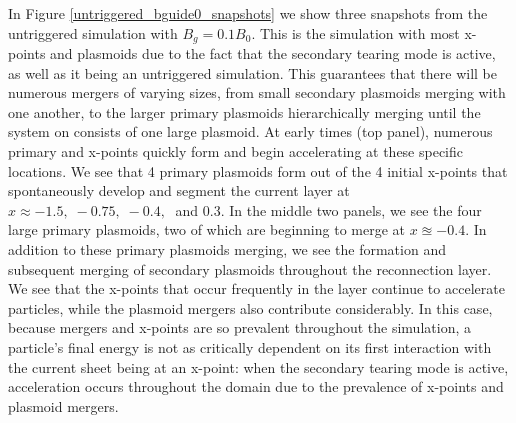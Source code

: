 \documentclass[iop,twocolappendix]{emulateapj}
\begin{document}


In Figure \ref{untriggered_bguide0_snapshots} we show three snapshots from the untriggered simulation with $B_{g}=0.1B_{0}$.  This is the simulation with most x-points and plasmoids due to the fact that the secondary tearing mode is active, as well as it being an untriggered simulation.  This guarantees that there will be numerous mergers of varying sizes, from small secondary plasmoids merging with one another, to the larger primary plasmoids hierarchically merging until the system on consists of one large plasmoid.  At early times (top panel), numerous primary and x-points quickly form and begin accelerating at these specific locations.  We see that 4 primary plasmoids form out of the 4 initial x-points that spontaneously develop and segment the current layer at $x\approx -1.5, \; -0.75, \; -0.4, \;$ and $0.3$.  In the middle two panels, we see the four large primary plasmoids, two of which are beginning to merge at $x \approxeq -0.4$.  In addition to these primary plasmoids merging, we see the formation and subsequent merging of secondary plasmoids throughout the reconnection layer.  We see that the x-points that occur frequently in the layer continue to accelerate particles, while the plasmoid mergers also contribute considerably.  In this case, because mergers and x-points are so prevalent throughout the simulation, a particle's final energy is not as critically dependent on its first interaction with the current sheet being at an x-point: when the secondary tearing mode is active, acceleration occurs throughout the domain due to the prevalence of x-points and plasmoid mergers. 
\end{document}

